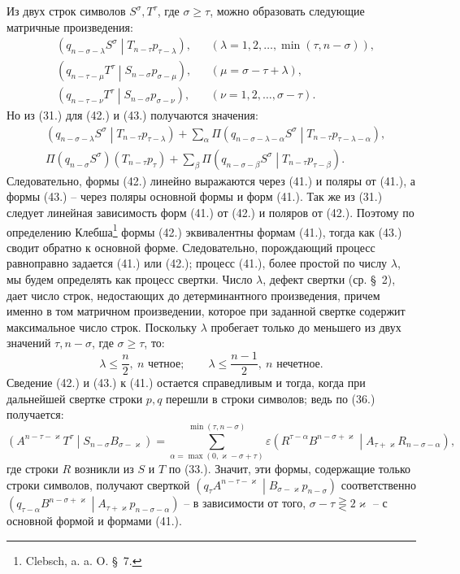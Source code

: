 \documentclass[11pt]{article}
\newcommand{\pair}[2]{\left(#1\middle|#2\right)}
\newcommand{\eps}{\varepsilon}
\begin{document}
Из двух строк символов $S^\sigma,T^\tau$, где $\sigma\ge\tau$, можно образовать следующие матричные произведения:
\begin{align}
&\pair{q_{n-\sigma-\lambda}S^\sigma}{T_{n-\tau}p_{\tau-\lambda}},
&&(\lambda=1,2,\ldots,\min(\tau,n-\sigma)),\tag{41}\\
&\pair{q_{n-\tau-\mu}T^\tau}{S_{n-\sigma}p_{\sigma-\mu}},
&&(\mu=\sigma-\tau+\lambda),\tag{42}\\
&\pair{q_{n-\tau-\nu}T^\tau}{S_{n-\sigma}p_{\sigma-\nu}},
&&(\nu=1,2,\ldots,\sigma-\tau).
\tag{43}
\end{align}
Но из (31.) для (42.) и (43.) получаются значения:
\begin{align}
&\pair{q_{n-\sigma-\lambda}S^\sigma}{T_{n-\tau}p_{\tau-\lambda}}
 +\sum_{\alpha}\Pi
 \pair{q_{n-\sigma-\lambda-\alpha}S^\sigma}
 {T_{n-\tau}p_{\tau-\lambda-\alpha}},\tag{42a}\\
&\Pi(q_{n-\sigma}S^\sigma)(T_{n-\tau}p_\tau)
 +\sum_{\beta}\Pi
 \pair{q_{n-\sigma-\beta}S^\sigma}{T_{n-\tau}p_{\tau-\beta}}.
\tag{43a}
\end{align}
Следовательно, формы (42.) линейно выражаются через (41.) и поляры от (41.), а формы (43.) -- через поляры основной формы и форм (41.). Так же из (31.) следует линейная зависимость форм (41.) от (42.) и поляров от (42.). Поэтому по определению Клебша\footnote{Clebsch, a. a. O. \S\ 7.} формы (42.) эквивалентны формам (41.), тогда как (43.) сводит обратно к основной форме. Следовательно, порождающий процесс равноправно задается (41.) или (42.); процесс (41.), более простой по числу $\lambda$, мы будем определять как процесс свертки. Число $\lambda$, дефект свертки (ср. \S\ 2), дает число строк, недостающих до детерминантного произведения, причем именно в том матричном произведении, которое при заданной свертке содержит максимальное число строк. Поскольку $\lambda$ пробегает только до меньшего из двух значений $\tau,n-\sigma$, где $\sigma\ge\tau$, то:
\begin{equation}
 \lambda\le\frac n2,\ n\text{ четное};\qquad
 \lambda\le\frac{n-1}{2},\ n\text{ нечетное}.
\tag{44}
\end{equation}
Сведение (42.) и (43.) к (41.) остается справедливым и тогда, когда при дальнейшей свертке строки $p,q$ перешли в строки символов; ведь по (36.) получается:
\[
 \pair{A^{n-\tau-\varkappa}T^\tau}{S_{n-\sigma}B_{\sigma-\varkappa}}
 =\sum_{\alpha=\max(0,\varkappa-\sigma+\tau)}^{\min(\tau,n-\sigma)}
 \eps\pair{R^{\tau-\alpha}B^{n-\sigma+\varkappa}}
 {A_{\tau+\varkappa}R_{n-\sigma-\alpha}},
\]
где строки $R$ возникли из $S$ и $T$ по (33.). Значит, эти формы, содержащие только строки символов, получают сверткой $\pair{q_\tau A^{n-\tau-\varkappa}}{B_{\sigma-\varkappa}p_{n-\sigma}}$ соответственно $\pair{q_{\tau-\alpha}B^{n-\sigma+\varkappa}}{A_{\tau+\varkappa}p_{n-\sigma-\alpha}}$ -- в зависимости от того, $\sigma-\tau\gtreqless 2\varkappa$ -- с основной формой и формами (41.).
\end{document}

